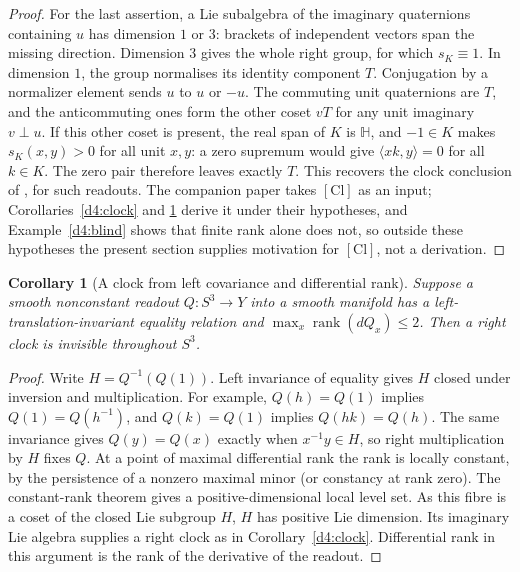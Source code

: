 \documentclass[11pt,reqno]{amsart}
\newtheorem{corollary}[theorem]{Corollary}
\theoremstyle{definition}
\theoremstyle{remark}
\numberwithin{equation}{section}
\begin{document}
\begin{proof}
For the last assertion, a Lie subalgebra of the imaginary quaternions
containing \(u\) has dimension \(1\) or \(3\): brackets of independent
vectors span the missing direction. Dimension \(3\) gives the whole
right group, for which \(s_K\equiv1\). In dimension \(1\), the group
normalises its identity component \(T\). Conjugation by a normalizer
element sends \(u\) to \(u\) or \(-u\). The commuting unit quaternions
are \(T\), and the anticommuting ones form the other coset \(vT\) for
any unit imaginary \(v\perp u\). If this other coset is present,
the real span of \(K\) is \(\mathbb H\), and \(-1\in K\) makes
\(s_K(x,y)>0\) for all unit \(x,y\): a zero supremum would give
\(\langle xk,y\rangle=0\) for all \(k\in K\). The zero pair therefore
leaves exactly \(T\). This recovers the clock conclusion of
\cite[Prop.~25]{Companion}, for such readouts.  The companion paper takes $[\mathrm{Cl}]$ as an input; Corollaries~\ref{d4:clock}
and \ref{d4:differential} derive it under their hypotheses, and Example~\ref{d4:blind} shows that finite rank alone does not, so
outside these hypotheses the present section supplies motivation for $[\mathrm{Cl}]$, not a derivation.
\end{proof}


\begin{corollary}[A clock from left covariance and differential rank]\label{d4:differential}
Suppose a smooth nonconstant readout \(Q:S^3\to Y\) into a smooth
manifold has a left-translation-invariant equality relation and
\(\max_x\operatorname{rank}(dQ_x)\le2\). Then a right clock is
invisible throughout \(S^3\).
\end{corollary}
\begin{proof}
Write \(H=Q^{-1}(Q(1))\). Left invariance of equality gives \(H\)
closed under inversion and multiplication. For example,
\(Q(h)=Q(1)\) implies \(Q(1)=Q(h^{-1})\), and
\(Q(k)=Q(1)\) implies \(Q(hk)=Q(h)\). The same invariance gives
\(Q(y)=Q(x)\) exactly when \(x^{-1}y\in H\), so right multiplication
by \(H\) fixes \(Q\). At a point of maximal differential rank
the rank is locally constant, by the persistence of a nonzero
maximal minor (or constancy at rank zero). The constant-rank theorem
gives a positive-dimensional local level set. As this fibre is a
coset of the closed Lie subgroup \(H\), \(H\) has positive Lie
dimension. Its imaginary Lie algebra supplies a right clock as in
Corollary~\ref{d4:clock}. Differential rank in this argument is the
rank of the derivative of the readout.
\end{proof}
\end{document}
